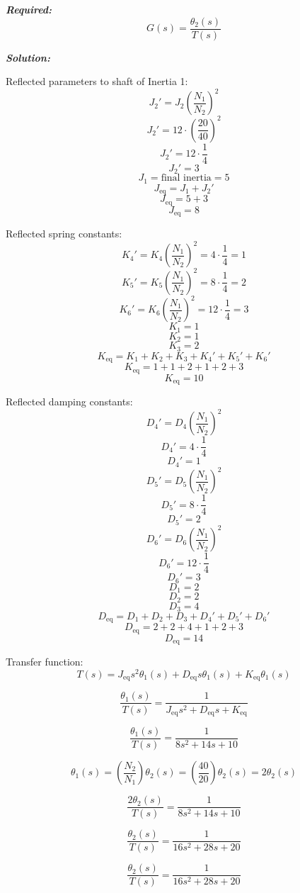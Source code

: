 ﻿\documentclass[11pt]{article}
\begin{document}
\vspace{12pt}

\noindent \textbf{\textit{Required:}}
\[
G(s) = \frac{\theta_2(s)}{T(s)}
\]

\vspace{12pt}


\noindent\textbf{\textit{Solution:}}

Reflected parameters to shaft of Inertia 1:
\[
J_2' = J_2 \left( \frac{N_1}{N_2} \right)^2 
\]
\[
J_2' = 12 \cdot \left( \frac{20}{40} \right)^2 
\]
\[
J_2' = 12 \cdot \frac{1}{4} 
\]
\[
J_2' = 3
\]
\[
J_1 = \text{final inertia} = 5
\]
\[
J_{\text{eq}} = J_1 + J_2' 
\]
\[
J_{\text{eq}} = 5 + 3 
\]
\[
J_{\text{eq}} = 8
\]

Reflected spring constants:
\[
K_4' = K_4 \left( \frac{N_1}{N_2} \right)^2 = 4 \cdot \frac{1}{4} = 1
\]
\[
K_5' = K_5 \left( \frac{N_1}{N_2} \right)^2 = 8 \cdot \frac{1}{4} = 2
\]
\[
K_6' = K_6 \left( \frac{N_1}{N_2} \right)^2 = 12 \cdot \frac{1}{4} = 3
\]
\[
K_1 = 1
\]
\[
K_2 = 1
\]
\[
K_3 = 2
\]
\[
K_{\text{eq}} = K_1 + K_2 + K_3 + K_4' + K_5' + K_6' 
\]
\[
K_{\text{eq}} = 1 + 1 + 2 + 1 + 2 + 3 
\]
\[
K_{\text{eq}} = 10
\]

Reflected damping constants:
\[
D_4' = D_4 \left( \frac{N_1}{N_2} \right)^2 
\]
\[
D_4' = 4 \cdot \frac{1}{4} 
\]
\[
D_4' = 1
\]
\[
D_5' = D_5 \left( \frac{N_1}{N_2} \right)^2 
\]
\[
D_5' = 8 \cdot \frac{1}{4} 
\]
\[
D_5' = 2
\]
\[
D_6' = D_6 \left( \frac{N_1}{N_2} \right)^2 
\]
\[
D_6' = 12 \cdot \frac{1}{4} 
\]
\[
D_6' = 3
\]
\[
D_1 = 2
\]
\[
D_2 = 2
\]
\[
D_3 = 4
\]
\[
D_{\text{eq}} = D_1 + D_2 + D_3 + D_4' + D_5' + D_6' 
\]
\[
D_{\text{eq}} = 2 + 2 + 4 + 1 + 2 + 3 
\]
\[
D_{\text{eq}} = 14
\]

Transfer function:
\[
T(s) = J_{\text{eq}} s^2 \theta_1(s) + D_{\text{eq}} s \theta_1(s) + K_{\text{eq}} \theta_1(s)
\]

\[
\frac{\theta_1(s)}{T(s)} = \frac{1}{J_{\text{eq}} s^2 + D_{\text{eq}} s + K_{\text{eq}}}
\]

\[
\frac{\theta_1(s)}{T(s)} = \frac{1}{8 s^2 + 14 s + 10}
\]

\[
\theta_1(s) = \left( \frac{N_2}{N_1} \right) \theta_2(s) = \left( \frac{40}{20} \right) \theta_2(s) = 2\theta_2(s)
\]

\[
\frac{2\theta_2(s)}{T(s)} = \frac{1}{8 s^2 + 14 s + 10}
\]

\[
\frac{\theta_2(s)}{T(s)} = \frac{1}{16 s^2 + 28 s + 20}
\]

\[
\boxed{\frac{\theta_2(s)}{T(s)} = \frac{1}{16 s^2 + 28 s + 20}}
\]
\end{document}
